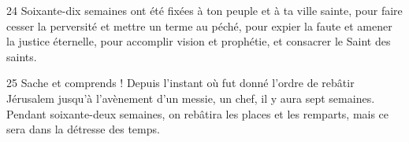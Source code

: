 
24 Soixante-dix semaines ont été fixées à ton peuple et à ta ville sainte, pour faire cesser la perversité et mettre un terme au péché, pour expier la faute et amener la justice éternelle, pour accomplir vision et prophétie, et consacrer le Saint des saints.

25 Sache et comprends ! Depuis l’instant où fut donné l’ordre de rebâtir Jérusalem jusqu’à l’avènement d’un messie, un chef, il y aura sept semaines. Pendant soixante-deux semaines, on rebâtira les places et les remparts, mais ce sera dans la détresse des temps.
